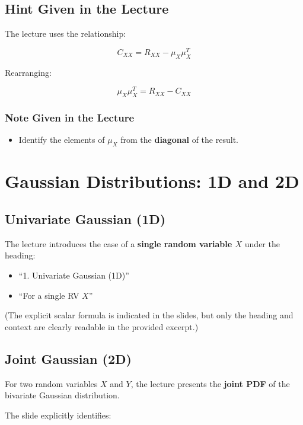 \documentclass[12pt]{article}
\begin{document}
\subsection{Hint Given in the Lecture}

The lecture uses the relationship:

\[
C_{XX} = R_{XX} - \mu_X \mu_X^T
\]

Rearranging:

\[
\mu_X \mu_X^T = R_{XX} - C_{XX}
\]

\subsubsection*{Note Given in the Lecture}

\begin{itemize}
    \item Identify the elements of \(\mu_X\) from the \textbf{diagonal} of the result.
\end{itemize}

\section{Gaussian Distributions: 1D and 2D}

\subsection{Univariate Gaussian (1D)}

The lecture introduces the case of a \textbf{single random variable \(X\)} under the heading:

\begin{itemize}
    \item ``1. Univariate Gaussian (1D)''
    \item ``For a single RV \(X\)''
\end{itemize}

(The explicit scalar formula is indicated in the slides, but only the heading and context are clearly readable in the provided excerpt.)

\subsection{Joint Gaussian (2D)}

For two random variables \(X\) and \(Y\), the lecture presents the \textbf{joint PDF} of the bivariate Gaussian distribution.

The slide explicitly identifies:
\end{document}
